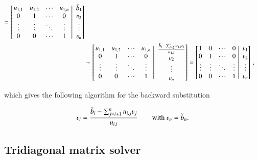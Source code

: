 \documentclass[11pt,english,a4paper]{article}
\begin{document}
\begin{flushleft}
\begin{align*}
=\kl{\left.\begin{matrix}  u_{1,1} & u_{1,2} & \cdots & u_{1,n} \\ 0 & 1 & \cdots & 0 \\ \vdots & \vdots & \ddots & \vdots \\ 0 & 0 & \cdots & 1  \end{matrix}\,\,\right\vert\,\,\begin{matrix} \check b_1 \\ \varv_2 \\ \vdots \\ \varv_n \end{matrix}}
\\ 
&\sim \kl{\left.\begin{matrix}  u_{1,1} & u_{1,2} & \cdots & u_{1,n} \\ 0 & 1 & \cdots & 0 \\ \vdots & \vdots & \ddots & \vdots \\ 0 & 0 & \cdots & 1  \end{matrix}\,\,\right\vert\,\,\begin{matrix} \frac{\check b_1-\sum_{i=2}^n u_{1,i} \varv_i}{u_{1,1}} \\ \varv_2 \\ \vdots \\ \varv_n \end{matrix}}
= \kl{\left.\begin{matrix}  1 & 0 & \cdots & 0 \\ 0 & 1 & \cdots & 0 \\ \vdots & \vdots & \ddots & \vdots \\ 0 & 0 & \cdots & 1  \end{matrix}\,\,\right\vert\,\,\begin{matrix} \varv_1 \\ \varv_2 \\ \vdots \\ \varv_n \end{matrix}} \,,
\end{align*}

which gives the following algorithm for the backward substitution

\begin{align}
\varv_i = \frac{\check b_i - \sum_{j=i+1}^n u_{i,j}\varv_j}{u_{i,i}} \qquad \text{with $\varv_n = \check b_n$.} 
\label{eq_4}
\end{align}

\subsection{Tridiagonal matrix solver}\label{sec_Tridiagonal}


\end{flushleft}
\end{document}
